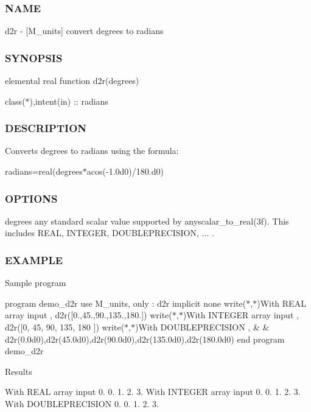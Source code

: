 \subsubsection*{N\+A\+ME}

d2r -\/ \mbox{[}M\+\_\+units\mbox{]} convert degrees to radians \subsubsection*{S\+Y\+N\+O\+P\+S\+IS}

elemental real function d2r(degrees)

class($\ast$),intent(in) \+:\+: radians \subsubsection*{D\+E\+S\+C\+R\+I\+P\+T\+I\+ON}

Converts degrees to radians using the formula\+:

radians=real(degrees$\ast$acos(-\/1.\+0d0)/180.d0) \subsubsection*{O\+P\+T\+I\+O\+NS}

degrees any standard scalar value supported by anyscalar\+\_\+to\+\_\+real(3f). This includes R\+E\+AL, I\+N\+T\+E\+G\+ER, D\+O\+U\+B\+L\+E\+P\+R\+E\+C\+I\+S\+I\+ON, ... . \subsubsection*{E\+X\+A\+M\+P\+LE}

Sample program

program demo\+\_\+d2r use M\+\_\+units, only \+: d2r implicit none write($\ast$,$\ast$)\textquotesingle{}With R\+E\+AL array input \textquotesingle{}, d2r(\mbox{[}0.,45.,90.,135.,180.\mbox{]}) write($\ast$,$\ast$)\textquotesingle{}With I\+N\+T\+E\+G\+ER array input \textquotesingle{}, d2r(\mbox{[}0,  45,  90,  135,  180  \mbox{]}) write($\ast$,$\ast$)\textquotesingle{}With D\+O\+U\+B\+L\+E\+P\+R\+E\+C\+I\+S\+I\+ON \textquotesingle{}, \& \& d2r(0.\+0d0),d2r(45.\+0d0),d2r(90.\+0d0),d2r(135.\+0d0),d2r(180.\+0d0) end program demo\+\_\+d2r

Results

With R\+E\+AL array input 0. 0. 1. 2. 3. With I\+N\+T\+E\+G\+ER array input 0. 0. 1. 2. 3. With D\+O\+U\+B\+L\+E\+P\+R\+E\+C\+I\+S\+I\+ON 0. 0. 1. 2. 3. 

